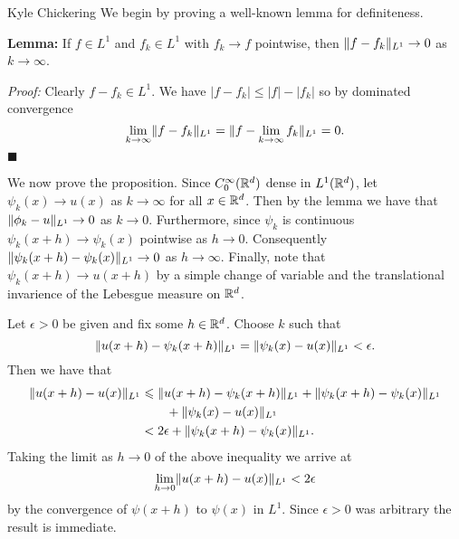

\begin{solution}{Kyle Chickering}
	We begin by proving a well-known lemma for definiteness.

	\textbf{Lemma:}
    If $f\in L^1$ and $f_k\in L^1$ with $f_k\rightarrow f$ pointwise, then $\lVert f-f_k\rVert_{L^1}\rightarrow 0$ as $k\rightarrow \infty$.
	
	\textit{Proof:}
    Clearly $f-f_k\in L^1$.
    We have $|f-f_k|\leqslant |f|-|f_k|$ so by dominated convergence
    \[ \lim_{k\rightarrow \infty}\lVert f-f_k\rVert_{L^1} = \lVert f-\lim_{k\rightarrow \infty}f_k\rVert_{L^1} = 0. \]
    $\blacksquare$

	We now prove the proposition.
    Since $C_0^\infty(\mathbb{R}^d)$ dense in $L^1(\mathbb{R}^d)$, let $\psi_k(x)\rightarrow u(x)$ as $k\rightarrow \infty$ for all $x\in \mathbb{R}^d$.
    Then by the lemma we have that $\lVert\phi_k-u\rVert_{L^1}\rightarrow 0$ as $k\rightarrow 0$.
    Furthermore, since $\psi_k$ is continuous $\psi_k(x+h)\rightarrow \psi_k(x)$ pointwise as $h\rightarrow 0$.
    Consequently $\lVert\psi_k(x+h)-\psi_k(x)\rVert_{L^1}\rightarrow 0$ as $h\rightarrow \infty$.
    Finally, note that $\psi_k(x+h)\rightarrow u(x+h)$ by a simple change of variable and the translational invarience of the Lebesgue measure on $\mathbb{R}^d$.

	Let $\epsilon > 0$ be given and fix some $h\in \mathbb{R}^d$.
    Choose $k$ such that
    \[ \lVert u(x+h)-\psi_k(x+h)\rVert_{L^1} = \lVert\psi_k(x)-u(x)\rVert_{L^1}< \epsilon. \]
	Then we have that
	\begin{align*}
		\lVert u(x+h)-u(x)\rVert_{L^1} &\leqslant \lVert u(x+h)-\psi_k(x+h)\rVert_{L^1} + \lVert\psi_k(x+h)-\psi_k(x)\rVert_{L^1} \\
                                 &\qquad+ \lVert\psi_k(x)-u(x)\rVert_{L^1} \\
                                 &< 2\epsilon + \lVert\psi_k(x+h)-\psi_k(x)\rVert_{L^1}.
	\end{align*}
	Taking the limit as $h\rightarrow 0$ of the above inequality we arrive at
    \[ \lim_{h\rightarrow 0}\lVert u(x+h)-u(x)\rVert_{L^1} < 2\epsilon \]
	by the convergence of $\psi(x+h)$ to $\psi(x)$ in $L^1$.
    Since $\epsilon > 0$ was arbitrary the result is immediate.
\end{solution}

